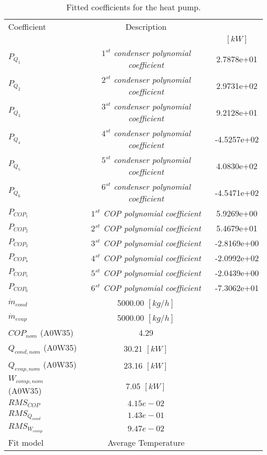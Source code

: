 \documentclass[english]{SPFShortReport}
\author{Dani Carbonell}
\begin{document}
\begin{table}[!ht]
\begin{small}
\caption{Fitted coefficients for the heat pump.}
\begin{center}
\resizebox{12cm}{!} 
{
\begin{tabular}{l | c c } 
\hline
\hline
Coefficient &Description & \\ 
 & &$[kW]$\\ 
\hline
$P_{Q_{1}}$ & \emph{$1^{st}$ condenser polynomial coefficient}  & 2.7878e+01    \\ 
$P_{Q_{2}}$ & \emph{$2^{st}$ condenser polynomial coefficient}  & 2.9731e+02    \\ 
$P_{Q_{3}}$ & \emph{$3^{st}$ condenser polynomial coefficient}  & 9.2128e+01    \\ 
$P_{Q_{4}}$ & \emph{$4^{st}$ condenser polynomial coefficient}  & -4.5257e+02    \\ 
$P_{Q_{5}}$ & \emph{$5^{st}$ condenser polynomial coefficient}  & 4.0830e+02    \\ 
$P_{Q_{6}}$ & \emph{$6^{st}$ condenser polynomial coefficient}  & -4.5471e+02    \\ 
\hline
$P_{COP_{1}}$ & \emph{$1^{st}$ COP polynomial coefficient}  & 5.9269e+00    \\ 
$P_{COP_{2}}$ & \emph{$2^{st}$ COP polynomial coefficient}  & 5.4679e+01    \\ 
$P_{COP_{3}}$ & \emph{$3^{st}$ COP polynomial coefficient}  & -2.8169e+00    \\ 
$P_{COP_{4}}$ & \emph{$4^{st}$ COP polynomial coefficient}  & -2.0992e+02    \\ 
$P_{COP_{5}}$ & \emph{$5^{st}$ COP polynomial coefficient}  & -2.0439e+00    \\ 
$P_{COP_{6}}$ & \emph{$6^{st}$ COP polynomial coefficient}  & -7.3062e+01    \\ 
\hline
$\dot m_{cond}$ & 5000.00 $[kg/h]$ \\ 
$\dot m_{evap}$ & 5000.00 $[kg/h]$ \\ 
\hline
$COP_{nom}$ (A0W35)& 4.29 \\ 
$Q_{cond,nom}$ (A0W35)& 30.21 $[kW]$\\ 
$Q_{evap,nom}$ (A0W35)& 23.16 $[kW]$\\ 
$W_{comp,nom}$ (A0W35)& 7.05 $[kW]$\\ 
\hline
 $RMS_{COP}$ & $4.15e-02$ \\ 
 $RMS_{Q_{cond}}$ & $1.43e-01$ \\ 
 $RMS_{W_{comp}}$ & $9.47e-02$ \\ 
\hline
Fit model & Average Temperature\\ 
\hline
\hline
\end{tabular}
}
\label{CoefTable}
\end{center}
\end{small}
\end{table}
\end{document}
